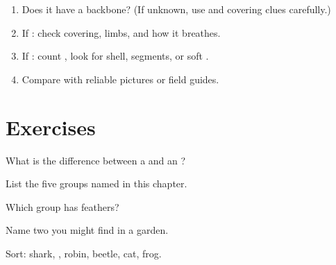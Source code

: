 \begin{method}\label{met:g5:vertebrates:key}
\begin{enumerate}
  \item Does it have a backbone? (If unknown, use  and 
        covering clues carefully.)
  \item If : check  covering, limbs, and how it breathes.
  \item If : count , look for shell, segments, or soft
        .
  \item Compare with reliable pictures or field guides.
\end{enumerate}
\end{method}

\section{Exercises}

\begin{exercise}[$\star$]\label{exo:g5:vertebrates:1}
What is the difference between a  and an ?
\end{exercise}

\begin{exercise}[$\star$]\label{exo:g5:vertebrates:2}
List the five  groups named in this chapter.
\end{exercise}

\begin{exercise}[$\star$]\label{exo:g5:vertebrates:3}
Which group has feathers?
\end{exercise}

\begin{exercise}[$\star$]\label{exo:g5:vertebrates:4}
Name two  you might find in a garden.
\end{exercise}

\begin{exercise}[$\star\star$]\label{exo:g5:vertebrates:5}
Sort: shark, , robin, beetle, cat, frog.
\end{exercise}

